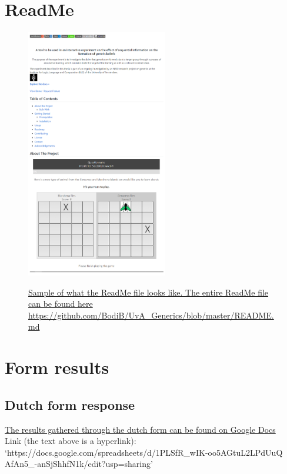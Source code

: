 \documentclass[twoside]{uva-inf-bachelor-thesis}
\theoremstyle{definition}
\begin{document}
\begin{appendices}
\chapter{ReadMe}
\begin{figure}[H]
    \centering
    \href{https://github.com/BodiB/UvA_Generics/blob/master/README.md}
    {
    \includegraphics[width=0.55\textwidth]{Project/Thesis/LaTeX/images/ReadMe.png}
    }
    \caption{
    \href{https://github.com/BodiB/UvA_Generics/blob/master/README.md}{Sample of what the ReadMe file looks like. The entire ReadMe file can be found here https://github.com/BodiB/UvA\_Generics/blob/master/README.md}}
    \label{fig:ReadMeExample}
\end{figure}




\chapter{Form results}
\section{Dutch form response}
\href{https://docs.google.com/spreadsheets/d/1PLSfR_wIK-oo5AGtuL2LPdUuQAfAn5_-anSjShhfN1k/edit?usp=sharing}{The results gathered through the dutch form can be found on Google Docs}\\
Link (the text above is a hyperlink):\\ `https://docs.google.com/spreadsheets/d/1PLSfR\_wIK-oo5AGtuL2LPdUuQ\\AfAn5\_-anSjShhfN1k/edit?usp=sharing'

\end{appendices}
\end{document}
